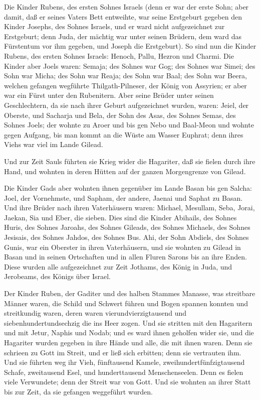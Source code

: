  Die Kinder Rubens, des ersten Sohnes Israels (denn er war
der erste Sohn; aber damit, daß er seines Vaters Bett entweihte, war
seine Erstgeburt gegeben den Kinder Josephs, des Sohnes Israels, und er
ward nicht aufgezeichnet zur Erstgeburt;  denn Juda, der
mächtig war unter seinen Brüdern, dem ward das Fürstentum vor ihm
gegeben, und Joseph die Erstgeburt).  So sind nun die Kinder
Rubens, des ersten Sohnes Israels: Henoch, Pallu, Hezron und Charmi.
 Die Kinder aber Joels waren: Semaja; des Sohnes war Gog;
des Sohnes war Simei;  des Sohn war Micha; des Sohn war
Reaja; des Sohn war Baal;  des Sohn war Beera, welchen
gefangen wegführte Thilgath-Pilneser, der König von Assyrien; er aber
war ein Fürst unter den Rubenitern.  Aber seine Brüder unter
seinen Geschlechtern, da sie nach ihrer Geburt aufgezeichnet wurden,
waren: Jeiel, der Oberste, und Sacharja  und Bela, der Sohn
des Asas, des Sohnes Semas, des Sohnes Joels; der wohnte zu Aroer und
bis gen Nebo und Baal-Meon  und wohnte gegen Aufgang, bis
man kommt an die Wüste am Wasser Euphrat; denn ihres Viehs war viel im
Lande Gilead.

 Und zur Zeit Sauls führten sie Krieg wider die Hagariter,
daß sie fielen durch ihre Hand, und wohnten in deren Hütten auf der
ganzen Morgengrenze von Gilead.

 Die Kinder Gads aber wohnten ihnen gegenüber im Lande
Basan bis gen Salcha:  Joel, der Vornehmste, und Sapham,
der andere, Jaenai und Saphat zu Basan.  Und ihre Brüder
nach ihren Vaterhäusern waren: Michael, Mesullam, Seba, Jorai, Jaekan,
Sia und Eber, die sieben.  Dies sind die Kinder Abihails,
des Sohnes Huris, des Sohnes Jaroahs, des Sohnes Gileads, des Sohnes
Michaels, des Sohnes Jesisais, des Sohnes Jahdos, des Sohnes Bus.
 Ahi, der Sohn Abdiels, des Sohnes Gunis, war ein Oberster
in ihren Vaterhäusern,  und sie wohnten zu Gilead in Basan
und in seinen Ortschaften und in allen Fluren Sarons bis an ihre Enden.
 Diese wurden alle aufgezeichnet zur Zeit Jothams, des
König in Juda, und Jerobeams, des Königs über Israel.

 Der Kinder Ruben, der Gaditer und des halben Stammes
Manasse, was streitbare Männer waren, die Schild und Schwert führen und
Bogen spannen konnten und streitkundig waren, deren waren
vierundvierzigtausend und siebenhundertundsechzig die ins Heer zogen.
 Und sie stritten mit den Hagaritern und mit Jetur, Naphis
und Nodab;  und es ward ihnen geholfen wider sie, und die
Hagariter wurden gegeben in ihre Hände und alle, die mit ihnen waren.
Denn sie schrieen zu Gott im Streit, und er ließ sich erbitten; denn sie
vertrauten ihm.  Und sie führten weg ihr Vieh, fünftausend
Kamele, zweihundertfünfzigtausend Schafe, zweitausend Esel, und
hunderttausend Menschenseelen.  Denn es fielen viele
Verwundete; denn der Streit war von Gott. Und sie wohnten an ihrer Statt
bis zur Zeit, da sie gefangen weggeführt wurden.

